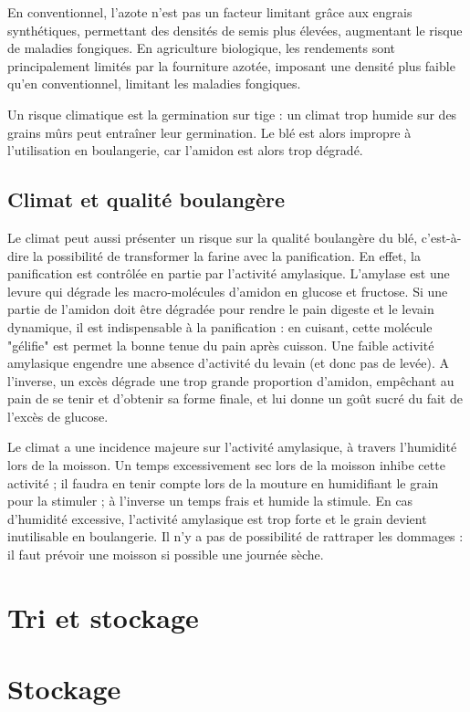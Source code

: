 \documentclass{article}
\begin{document}
En conventionnel, l'azote n'est pas un facteur limitant grâce aux engrais synthétiques, permettant des densités de semis plus élevées, augmentant le risque de maladies fongiques. En agriculture biologique, les rendements sont principalement limités par la fourniture azotée, imposant une densité plus faible qu'en conventionnel, limitant les maladies fongiques. 

Un risque climatique est la germination sur tige : un climat trop humide sur des grains mûrs peut entraîner leur germination. Le blé est alors impropre à l'utilisation en boulangerie, car l'amidon est alors trop dégradé.

\subsection{Climat et qualité boulangère}

Le climat peut aussi présenter un risque sur la qualité boulangère du blé, c'est-à-dire la possibilité de transformer la farine avec la panification. En effet, la panification est contrôlée en partie par l'activité amylasique. L'amylase est une levure qui dégrade les macro-molécules d'amidon en glucose et fructose. Si une partie de l'amidon doit être dégradée pour rendre le pain digeste et le levain dynamique, il est indispensable à la panification : en cuisant, cette molécule "gélifie" est permet la bonne tenue du pain après cuisson. Une faible activité amylasique engendre une absence d'activité du levain (et donc pas de levée). A l'inverse, un excès dégrade une trop grande proportion d'amidon, empêchant au pain de se tenir et d'obtenir sa forme finale, et lui donne un goût sucré du fait de l'excès de glucose.

Le climat a une incidence majeure sur l'activité amylasique, à travers l'humidité lors de la moisson. Un temps excessivement sec lors de la moisson inhibe cette activité ; il faudra en tenir compte lors de la mouture en humidifiant le grain pour la stimuler ; à l'inverse un temps frais et humide la stimule. En cas d'humidité excessive, l'activité amylasique est trop forte et le grain devient inutilisable en boulangerie. Il n'y a pas de possibilité de rattraper les dommages : il faut prévoir une moisson si possible une journée sèche. 

\section{Tri et stockage}

\section{Stockage}
\end{document}
